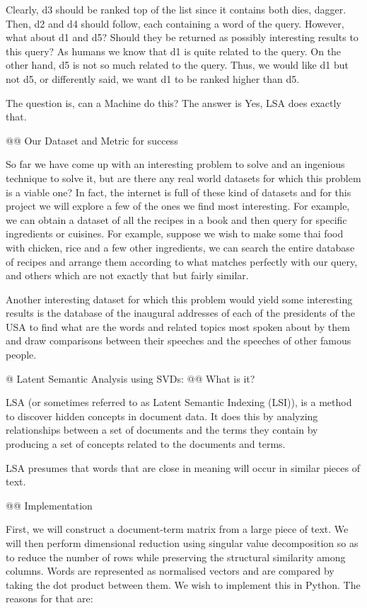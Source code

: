 \documentclass[10pt]{article}
\begin{document}
\begin{easylist}[enumerate]
{    Clearly, d3 should be ranked top of the list since it contains both dies,
    dagger. Then, d2 and d4 should follow, each containing a word of the query.
    However, what about d1 and d5? Should they be returned as possibly
    interesting results to this query? As humans we know that d1 is quite
    related to the query. On the other hand, d5 is not so much related to the
    query. Thus, we would like d1 but not d5, or differently said, we want d1 to
    be ranked higher than d5.}

    The question is, can a Machine do this? The answer is Yes, LSA does exactly
    that.

    @@ Our Dataset and Metric for success

    So far we have come up with an interesting problem to solve and an ingenious
    technique to solve it, but are there any real world datasets for which this
    problem is a viable one? In fact, the internet is full of these kind of
    datasets and for this project we will explore a few of the ones we find most
    interesting. For example, we can obtain a dataset of all the recipes in a
    book and then query for specific ingredients or cuisines. For example,
    suppose we wish to make some thai food with chicken, rice and a few other
    ingredients, we can search the entire database of recipes and arrange them
    according to what matches perfectly with our query, and others which are not
    exactly that but fairly similar. 

    Another interesting dataset for which this problem would yield some interesting
    results is the database of the inaugural addresses of each of the presidents of
    the USA to find what are the words and related topics most spoken about by them
    and draw comparisons between their speeches and the speeches of other famous
    people.


    @ Latent Semantic Analysis using SVDs:
    @@ What is it?

    LSA (or sometimes referred to as Latent Semantic Indexing (LSI)), is a
    method to discover hidden concepts in document data. It does this by
    analyzing relationships between a set of documents and the terms they
    contain by producing a set of concepts related to the documents and terms.

    LSA presumes that words that are close in  meaning will occur in similar
    pieces of text. 

    @@ Implementation

    First, we will construct a document-term matrix from a large piece of text. We will then perform dimensional reduction using singular value decomposition so as to reduce the number of rows while preserving the structural similarity among columns. Words are represented as normalised vectors and are compared by taking the dot product between them. 
    We wish to implement this in Python. The reasons for that are: 


\end{easylist}
\end{document}
